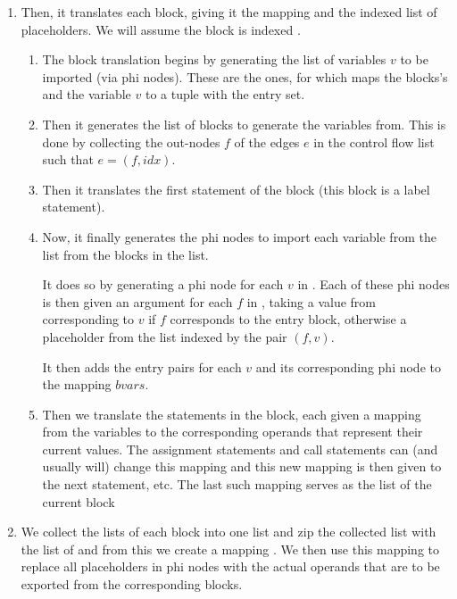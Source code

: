 \begin{enumerate}
    \item Then, it translates each block, giving it the  mapping and the indexed list of placeholders. We will assume the block is indexed .
    
    \begin{enumerate}
        \item The block translation begins by generating the list  of variables $v$ to be imported (via phi nodes). These are the ones, for which  maps the blocks's  and the variable $v$ to a tuple with the  entry set.
        
        \item Then it generates the list  of blocks to generate the variables from. This is done by collecting the out-nodes $f$ of the edges $e$ in the control flow list such that $e = (f, idx)$.
        
        \item Then it translates the first statement of the block (this block is a label statement).
        
        \item Now, it finally generates the phi nodes to import each variable from the  list from the blocks in the  list.
        
        It does so by generating a phi node for each $v$ in . Each of these phi nodes is then given an argument for each $f$ in , taking a value from  corresponding to $v$ if $f$ corresponds to the entry block, otherwise a placeholder from the  list indexed by the pair $(f, v)$. 


        It then adds the entry pairs for each $v$ and its corresponding phi node to the  mapping $bvars$.

        \item Then we translate the statements in the block, each given a mapping from the variables to the corresponding operands that represent their current values. The assignment statements and call statements can (and usually will) change this mapping and this new mapping is then given to the next statement, etc. The last such mapping serves as the  list of the current block        
    \end{enumerate}

    \item We collect the  lists of each block into one list and zip the collected list with the list of   and from this we create a mapping . We then use this mapping to replace all placeholders in phi nodes with the actual operands that are to be exported from the corresponding blocks. 
\end{enumerate}

